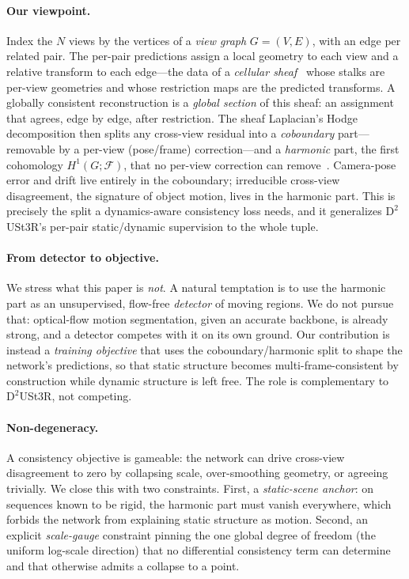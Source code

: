 \documentclass{article}
\newcommand{\sheaf}{\mathcal{F}}
\newcommand{\Hcoh}{H}
\theoremstyle{definition}
\theoremstyle{plain}
\theoremstyle{remark}
\begin{document}
\paragraph{Our viewpoint.}
Index the $N$ views by the vertices of a \emph{view graph} $G=(V,E)$, with
an edge per related pair. The per-pair predictions assign a local geometry
to each view and a relative transform to each edge---the data of a
\emph{cellular sheaf}~\citep{curry2014sheaves,ghrist2014elementary} whose
stalks are per-view geometries and whose restriction maps are the
predicted transforms. A globally consistent reconstruction is a
\emph{global section} of this sheaf: an assignment that agrees, edge by
edge, after restriction. The sheaf Laplacian's Hodge decomposition then
splits any cross-view residual into a \emph{coboundary} part---removable
by a per-view (pose/frame) correction---and a \emph{harmonic} part, the
first cohomology $\Hcoh^1(G;\sheaf)$, that no per-view correction can
remove~\citep{hansen2019toward,robinson2017sheaves}. Camera-pose error and
drift live entirely in the coboundary; irreducible cross-view
disagreement, the signature of object motion, lives in the harmonic part.
This is precisely the split a dynamics-aware consistency loss needs, and
it generalizes $\mathrm{D}^2$USt3R's per-pair static/dynamic supervision
to the whole tuple.

\paragraph{From detector to objective.}
We stress what this paper is \emph{not}. A natural temptation is to use
the harmonic part as an unsupervised, flow-free \emph{detector} of moving
regions. We do not pursue that: optical-flow motion segmentation, given an
accurate backbone, is already strong, and a detector competes with it on
its own ground. Our contribution is instead a \emph{training objective}
that uses the coboundary/harmonic split to shape the network's
predictions, so that static structure becomes multi-frame-consistent by
construction while dynamic structure is left free. The role is
complementary to $\mathrm{D}^2$USt3R, not competing.

\paragraph{Non-degeneracy.}
A consistency objective is gameable: the network can drive cross-view
disagreement to zero by collapsing scale, over-smoothing geometry, or
agreeing trivially. We close this with two constraints. First, a
\emph{static-scene anchor}: on sequences known to be rigid, the harmonic
part must vanish everywhere, which forbids the network from explaining
static structure as motion. Second, an explicit \emph{scale-gauge}
constraint pinning the one global degree of freedom (the uniform log-scale
direction) that no differential consistency term can determine and that
otherwise admits a collapse to a point.
\end{document}

